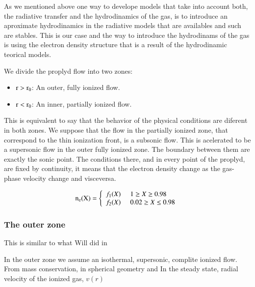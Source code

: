 \documentclass[aaspp]{article}
\begin{document}
As we mentioned above one way to develope models that take into account both, the radiative transfer and the hydrodinamics of the gas, is to introduce an aproximate hydrodinamics in the radiative models that are availables and such are stables. This is our case and the way to introduce the hydrodinams of the gas is using the electron density structure that is a result of the hydrodinamic teorical models.

We divide the proplyd flow into two zones:

\begin{itemize}
  \item{$\rm r > r_0$: An outer, fully ionized flow.}
    \item{$\rm r < r_0$: An inner, partially ionized flow.}
\end{itemize}

This is equivalent to say that the behavior of the physical conditions are diferent in both zones. We suppose that the flow in the partially ionized zone, that correspond to the thin ionization front, is a subsonic flow. This is acelerated to be a supersonic flow in the outer fully ionized zone. The boundary between them are exactly the sonic point. The conditions there, and in every point of the proplyd, are fixed by continuity, it means that the electron density change as the gas-phase velocity change and visceversa. 

\begin{equation}
  \rm n_e(X) = \left\lbrace
    \begin{array}{l}
      f_1(X) \;\;\;\;\; 1 \ge X \ge 0.98 \\
      f_2(X) \;\;\;\;\;  0.02 \ge X \le 0.98  \\
    \end{array}
  \right.
\end{equation}

\subsubsection{The outer zone}
\label{sec:outer}

This is similar to what Will did in \citep{2002ApJ...566..315H}

In the outer zone we assume an isothermal, supersonic, complite
ionized flow. From mass conservation, in spherical geometry and In the
steady state, radial velocity of the ionized gas, $v(r)$
\end{document}
